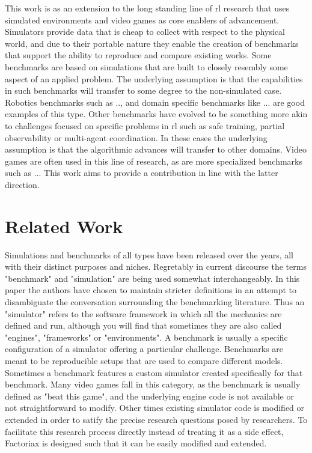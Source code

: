 \documentclass{article}
\begin{document}
This work is as an extension to the long standing line of \gls{rl} research that uses simulated environments and video games as core enablers of advancement.
Simulators provide data that is cheap to collect with respect to the physical world, and due to their portable nature they enable the creation of benchmarks that support the ability to reproduce and compare existing works.
Some benchmarks are based on simulations that are built to closely resembly some aspect of an applied problem. 
The underlying assumption is that the capabilities in such benchmarks will transfer to some degree to the non-simulated case. 
Robotics benchmarks such as .., and domain specific benchmarks like ... are good examples of this type.
Other benchmarks have evolved to be something more akin to challenges focused on specific problems in \gls{rl} such as safe training, partial observability or multi-agent coordination.
In these cases the underlying assumption is that the algorithmic advances will transfer to other domains.
Video games are often used in this line of research, as are more specialized benchmarks such as ...
This work aims to provide a contribution in line with the latter direction.



\section{Related Work}
Simulations and benchmarks of all types have been released over the years, all with their distinct purposes and niches. 
Regretably in current discourse the terms "benchmark" and "simulation" are being used somewhat interchangeably. 
In this paper the authors have chosen to maintain stricter definitions in an attempt to disambiguate the conversation surrounding the benchmarking literature.
Thus an "simulator" refers to the software framework in which all the mechanics are defined and run, although you will find that sometimes they are also called "engines", "frameworks" or "environments".
A benchmark is usually a specific configuration of a simulator offering a particular challenge.
Benchmarks are meant to be reproducible setups that are used to compare different models.
Sometimes a benchmark features a custom simulator created specifically for that benchmark.
Many video games fall in this category, as the benchmark is usually defined as "beat this game", and the underlying engine code is not available or not straightforward to modify. 
Other times existing simulator code is modified or extended in order to satify the precise research questions posed by researchers. 
To facilitate this research process directly instead of treating it as a side effect, Factoriax is designed such that it can be easily modified and extended.  
\end{document}
